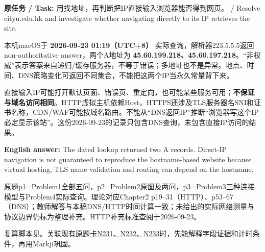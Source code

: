 

\textbf{原任务 / Task:} 用找地址，再判断把IP直接输入浏览器能否得到网页。 / Resolve cityu.edu.hk and investigate whether navigating directly to its IP retrieves the site.


本机macOS于 \textbf{2026-09-23 01:19（UTC+8）} 实际查询，解析器223.5.5.5返回non-authoritative answer，两个A地址为 \textbf{45.60.199.218、45.60.197.218}。“非权威”表示答案来自递归/缓存服务器，不等于错误；多地址也不是异常。地点、时间、DNS策略变化可返回不同集合，不能把这两个IP当永久常量背下来。


直接输入IP可能打开默认页面、错误页、重定向，也可能某些服务可用；\textbf{不保证与域名访问相同}。HTTP虚拟主机依赖Host，HTTPS还涉及TLS服务器名SNI和证书名称，CDN/WAF可能按域名路由。不能从“DNS返回IP”推断“浏览器写这个IP必定显示该站”。这份2026-09-23的记录只包含DNS查询，未包含直接IP访问的结果。


\textbf{English answer:} The dated lookup returned two A records. Direct-IP navigation is not guaranteed to reproduce the hostname-based website because virtual hosting, TLS name validation and routing can depend on the hostname.





原题p1=Problem1全部五问，p2=Problem2原图及两问，p3=Problem3三种连接模型与Problem4实际查询。理论对应Chapter2 p19–31（HTTP）、p53–67（DNS）；教师解答与本稿DNS/HTTP时间计算一致；未给出的实际网络测量与协议边界仍标为整理补充。HTTP补充标准查阅于2026-09-23。


复算脚本见。关联\href{https://crazyshout.github.io/micro-course/cards.html\#CS5222-N231}{现有原题卡N231、N232、N233}时，先能解释字段证据和计时条件，再用Markji巩固。
